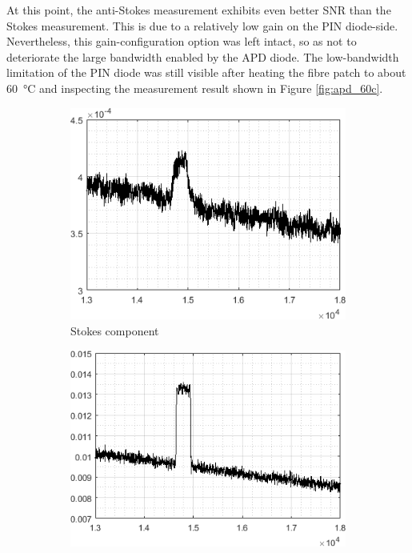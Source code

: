 \documentclass{standalone}
\begin{document}
At this point, the anti-Stokes measurement exhibits even better SNR than the Stokes measurement. This is due to a relatively low gain on the PIN diode-side. Nevertheless, this gain-configuration option was left intact, so as not to deteriorate the large bandwidth enabled by the APD diode. The low-bandwidth limitation of the PIN diode was still visible after heating the fibre patch to about \SI{60}{\celsius} and inspecting the measurement result shown in Figure \ref{fig:apd_60c}.
\begin{figure}[h]
	\centering
	\begin{subfigure}[b]{0.49\textwidth}
		\includegraphics[width=\textwidth]{apd_60c_stokes.png}
		\caption{Stokes component}
	\end{subfigure}
	\begin{subfigure}[b]{0.49\textwidth}
		\includegraphics[width=\textwidth]{apd_60c_antistokes.png}

\end{subfigure}
\end{figure}
\end{document}
